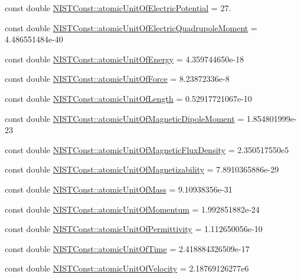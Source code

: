 \begin{DoxyCompactItemize}
const double \hyperlink{group___atomic_unit_ga139c6486b1899658838d403380fc229a}{N\+I\+S\+T\+Const\+::atomic\+Unit\+Of\+Electric\+Potential} = 27.
\item 
const double \hyperlink{group___atomic_unit_gae7f2ec900567291168cdf7351248074d}{N\+I\+S\+T\+Const\+::atomic\+Unit\+Of\+Electric\+Quadrupole\+Moment} = 4.\+486551484e-\/40
\item 
const double \hyperlink{group___atomic_unit_gadc3fdb8850235efe9e73bcf733fdbfe8}{N\+I\+S\+T\+Const\+::atomic\+Unit\+Of\+Energy} = 4.\+359744650e-\/18
\item 
const double \hyperlink{group___atomic_unit_ga2788fede3c8dab37305c9510cbb95001}{N\+I\+S\+T\+Const\+::atomic\+Unit\+Of\+Force} = 8.\+23872336e-\/8
\item 
const double \hyperlink{group___atomic_unit_ga246e4c3edecdd5aa1d5d208fc02a4636}{N\+I\+S\+T\+Const\+::atomic\+Unit\+Of\+Length} = 0.\+52917721067e-\/10
\item 
const double \hyperlink{group___atomic_unit_ga56b280760cc855923e548c6676d90916}{N\+I\+S\+T\+Const\+::atomic\+Unit\+Of\+Magnetic\+Dipole\+Moment} = 1.\+854801999e-\/23
\item 
const double \hyperlink{group___atomic_unit_gaaf4c9b5c25a5e1bee2f65c8a82e0ee63}{N\+I\+S\+T\+Const\+::atomic\+Unit\+Of\+Magnetic\+Flux\+Density} = 2.\+350517550e5
\item 
const double \hyperlink{group___atomic_unit_ga9c2b29b9a46e8dfd78837ef0c8a16bec}{N\+I\+S\+T\+Const\+::atomic\+Unit\+Of\+Magnetizability} = 7.\+8910365886e-\/29
\item 
const double \hyperlink{group___atomic_unit_ga61a2da51489f7bb8965e9e4747db34a7}{N\+I\+S\+T\+Const\+::atomic\+Unit\+Of\+Mass} = 9.\+10938356e-\/31
\item 
const double \hyperlink{group___atomic_unit_gae70262618755d765a1de59f471b56040}{N\+I\+S\+T\+Const\+::atomic\+Unit\+Of\+Momentum} = 1.\+992851882e-\/24
\item 
const double \hyperlink{group___atomic_unit_ga0b7518cf6058bb899c64b32b43bda955}{N\+I\+S\+T\+Const\+::atomic\+Unit\+Of\+Permittivity} = 1.\+112650056e-\/10
\item 
const double \hyperlink{group___atomic_unit_ga6181f64b8320afb6ecacc9c7f7e27afa}{N\+I\+S\+T\+Const\+::atomic\+Unit\+Of\+Time} = 2.\+418884326509e-\/17
\item 
const double \hyperlink{group___atomic_unit_gaf22e630a5412176c4d94dbc8b1e36f70}{N\+I\+S\+T\+Const\+::atomic\+Unit\+Of\+Velocity} = 2.\+18769126277e6
\end{DoxyCompactItemize}



